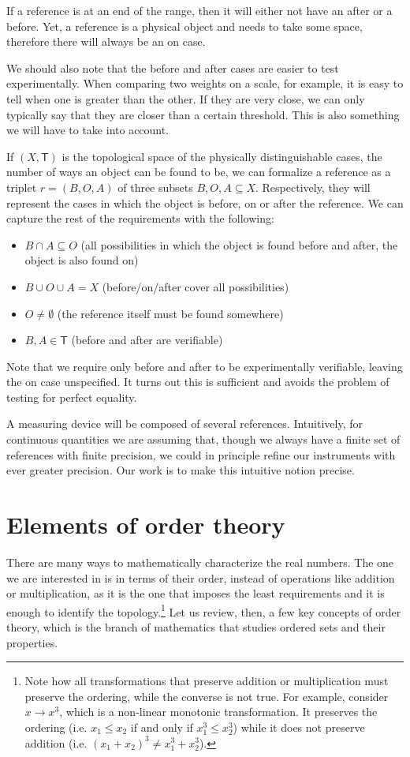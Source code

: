 \documentclass[12pt]{iopart}
\begin{document}
If a reference is at an end of the range, then it will either not have an after or a before. Yet, a reference is a physical object and needs to take some space, therefore there will always be an on case.

We should also note that the before and after cases are easier to test experimentally. When comparing two weights on a scale, for example, it is easy to tell when one is greater than the other. If they are very close, we can only typically say that they are closer than a certain threshold. This is also something we will have to take into account.

If $(X, \mathsf{T})$ is the topological space of the physically distinguishable cases, the number of ways an object can be found to be, we can formalize a reference as a triplet $r = (B, O, A)$ of three subsets $B, O, A \subseteq X$. Respectively, they will represent the cases in which the object is before, on or after the reference. We can capture the rest of the requirements with the following:
\begin{itemize}
	\item $B \cap A \subseteq O$ (all possibilities in which the object is found before and after, the object is also found on)
	\item $B \cup O \cup A = X$ (before/on/after cover all possibilities)
	\item $O \neq \emptyset$ (the reference itself must be found somewhere)
	\item $B, A \in \mathsf{T}$ (before and after are verifiable)
\end{itemize}
Note that we require only before and after to be experimentally verifiable, leaving the on case unspecified. It turns out this is sufficient and avoids the problem of testing for perfect equality.

A measuring device will be composed of several references. Intuitively, for continuous quantities we are assuming that, though we always have a finite set of references with finite precision, we could in principle refine our instruments with ever greater precision. Our work is to make this intuitive notion precise.

\section{Elements of order theory}

There are many ways to mathematically characterize the real numbers. The one we are interested in is in terms of their order, instead of operations like addition or multiplication, as it is the one that imposes the least requirements and it is enough to identify the topology.\footnote{Note how all transformations that preserve addition or multiplication must preserve the ordering, while the converse is not true. For example, consider $x \to x^3$, which is a non-linear monotonic transformation. It preserves the ordering (i.e. $x_1 \leq x_2$ if and only if $x_1^3 \leq x_2^3$) while it does not preserve addition (i.e. $(x_1 + x_2)^3 \neq x_1^3 + x_2^3$).} Let us review, then, a few key concepts of order theory, which is the branch of mathematics that studies ordered sets and their properties.
\end{document}
